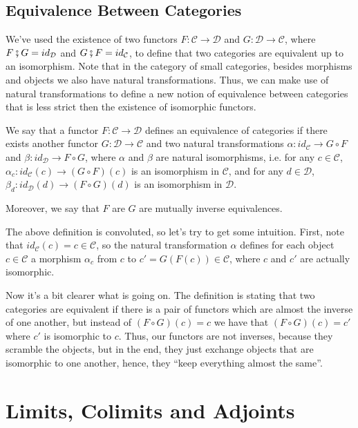 \subsection{Equivalence Between Categories}

We've used the existence of two functors $F:\mathcal C \to \mathcal D$ and $G:\mathcal D \to \mathcal C$,
where $F \fatsemi G = id_\mathcal D$ and $G \fatsemi F = id_\mathcal C$,
to define that two categories are equivalent up to an isomorphism.
Note that in the category of small categories, besides morphisms and objects we also
have natural transformations. Thus, we can make use of natural transformations to
define a new notion of equivalence between categories that is less strict then 
the existence of isomorphic functors.

\begin{definition}
  We say that a functor $F:\mathcal C \to \mathcal D$ defines an equivalence of
  categories if there exists another functor $G:\mathcal D \to \mathcal C$ and
  two natural transformations
  $\alpha: id_\mathcal C \to G \circ F$ and
  $\beta: id_\mathcal D \to F \circ G$, where $\alpha$ and $\beta$ are natural isomorphisms,
  i.e. for any $c \in \mathcal C$,
  $\alpha_c:id_\mathcal C(c) \to (G \circ F)(c)$ is an
  isomorphism in $\mathcal C$, and for any $d \in \mathcal D$, 
  $\beta_d:id_\mathcal D(d) \to (F \circ G)(d)$ is an isomorphism in $\mathcal D$.

  Moreover, we say that $F$ are $G$ are mutually inverse equivalences.
  \label{def:EquivalenceCategories}
\end{definition}

The above definition is convoluted, so let's try to get some intuition.
First, note that $id_\mathcal C(c) = c \in \mathcal C$, so the natural transformation
$\alpha$ defines for each object $c \in \mathcal C$ a morphism $\alpha_c$ from $c$
to $c' = G(F(c)) \in \mathcal C$, where $c$ and $c'$ are actually isomorphic.

Now it's a bit clearer what is going on. The definition is stating that two
categories are equivalent if there is a pair of functors which are almost the inverse
of one another, but instead of $(F \circ G)(c) = c$ we have that
$(F \circ G )(c) = c'$  where $c'$ is isomorphic to $c$.
Thus, our functors are not inverses, because they scramble the objects, but in the end,
they just exchange objects that are isomorphic to one another, hence, they ``keep everything
almost the same''.


\section{Limits, Colimits and Adjoints}

